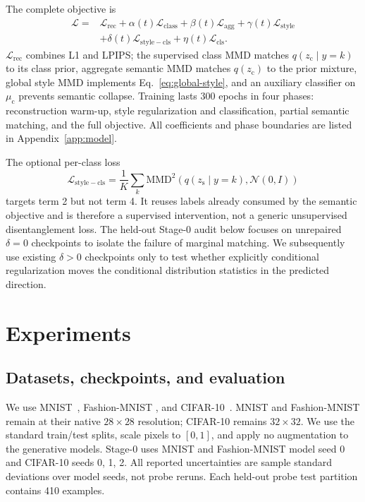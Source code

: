 \documentclass{article}
\newcommand{\zc}{z_{\mathrm{c}}}
\newcommand{\zs}{z_{\mathrm{s}}}
\newcommand{\muc}{\mu_{\mathrm{c}}}
\newcommand{\MMD}{\mathrm{MMD}}
\begin{document}
The complete objective is
\begin{align}
\mathcal L={}&\mathcal L_{\mathrm{rec}}
+\alpha(t)\mathcal L_{\mathrm{class}}
+\beta(t)\mathcal L_{\mathrm{agg}}
+\gamma(t)\mathcal L_{\mathrm{style}}\nonumber\\
&+\delta(t)\mathcal L_{\mathrm{style-cls}}
+\eta(t)\mathcal L_{\mathrm{cls}}.
\label{eq:objective}
\end{align}
$\mathcal L_{\mathrm{rec}}$ combines L1 and LPIPS; the supervised class MMD
matches $q(\zc\mid y=k)$ to its class prior, aggregate semantic MMD matches
$q(\zc)$ to the prior mixture, global style MMD implements
Eq.~\ref{eq:global-style}, and an auxiliary classifier on $\muc$ prevents
semantic collapse.  Training lasts 300 epochs in four phases: reconstruction
warm-up, style regularization and classification, partial semantic matching,
and the full objective.  All coefficients and phase boundaries are listed in
Appendix~\ref{app:model}.

The optional per-class loss
\begin{equation}
\mathcal L_{\mathrm{style-cls}}=
\frac1K\sum_k\MMD^2(q(\zs\mid y=k),\mathcal N(0,I))
\label{eq:perclass}
\end{equation}
targets term 2 but not term 4.  It reuses labels already consumed by the
semantic objective and is therefore a supervised intervention, not a generic
unsupervised disentanglement loss.  The held-out Stage-0 audit below focuses
on unrepaired $\delta=0$ checkpoints to isolate the failure of marginal
matching.  We subsequently use existing $\delta>0$ checkpoints only to test
whether explicitly conditional regularization moves the conditional
distribution statistics in the predicted direction.

\section{Experiments}
\label{sec:experiments}

\iffalse %

\subsection{Datasets, checkpoints, and evaluation}

We use MNIST~\citep{lecun1998gradient}, Fashion-MNIST
\citep{xiao2017fashion}, and CIFAR-10~\citep{krizhevsky2009learning}.  MNIST
and Fashion-MNIST remain at their native $28\times28$ resolution; CIFAR-10
remains $32\times32$.  We use the standard train/test splits, scale pixels to
$[0,1]$, and apply no augmentation to the generative models.  Stage-0 uses
MNIST and Fashion-MNIST model seed 0 and CIFAR-10 seeds 0, 1, 2.  All reported
uncertainties are sample standard deviations over model seeds, not probe
reruns.  Each held-out probe test partition contains 410 examples.
\end{document}
